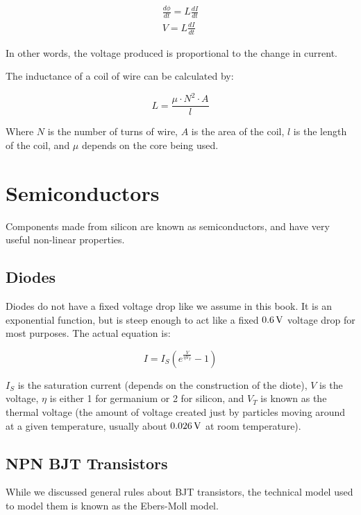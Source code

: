 \begin{align}
\frac{d\phi}{dt} = L\frac{dI}{dt} \\
V = L\frac{dI}{dt}
\end{align}

In other words, the voltage produced is proportional to the change in current.

The inductance of a coil of wire can be calculated by:

\begin{equation}
L = \frac{\mu \cdot N^2 \cdot A}{l}
\end{equation}

Where $N$ is the number of turns of wire, $A$ is the area of the coil, $l$ is the length of the coil, and $\mu$ depends on the core being used.

\section{Semiconductors}

Components made from silicon are known as semiconductors, and have very useful non-linear properties.

\subsection{Diodes}

Diodes do not have a fixed voltage drop like we assume in this book.  
It is an exponential function, but is steep enough to act like a fixed $0.6\,\si{\volt}$ voltage drop for most purposes.
The actual equation is:

\begin{equation}
I = I_S (e^{\frac{V}{\eta V_T}} - 1)
\end{equation}

$I_S$ is the saturation current (depends on the construction of the diote), $V$ is the voltage, $\eta$ is either 1 for germanium or 2 for silicon, and $V_T$ is known as the thermal voltage (the amount of voltage created just by particles moving around at a given temperature, usually about $0.026\,\si{\volt}$ at room temperature).

\subsection{NPN BJT Transistors}

While we discussed general rules about BJT transistors, the technical model used to model them is known as the Ebers-Moll model.

